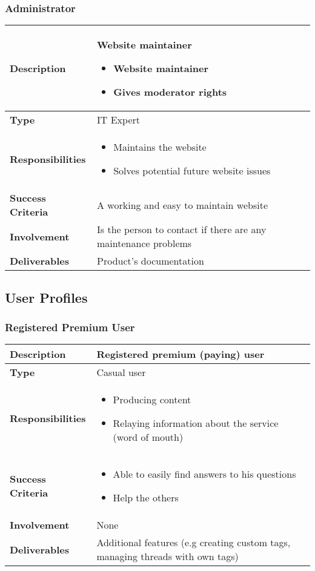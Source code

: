 \documentclass [a4paper, 12pt] {article}
\begin{document}
\subsubsection{Administrator}
\begin{tabular}{| >{\bfseries} M{4cm} | M{10cm} |}
	\hline
	Description & Website maintainer
	\begin{itemize}
		\item Website maintainer
		\item Gives moderator rights
	\end{itemize} \tabularnewline
	\hline
	Type & IT Expert \tabularnewline
	\hline
	Responsibilities &
	\begin{itemize}
		\item Maintains the website
		\item Solves potential future website issues
	\end{itemize} \tabularnewline
	\hline
	Success Criteria & A working and easy to maintain website \tabularnewline
	\hline
	Involvement & Is the person to contact if there are any maintenance problems \tabularnewline
	\hline
	Deliverables & Product's documentation \tabularnewline
	\hline
\end{tabular}

\subsection{User Profiles}
\subsubsection{Registered Premium User}
\begin{tabular}{| >{\bfseries} M{4cm} | M{10cm} |}
	\hline
	Description & Registered premium (paying) user \tabularnewline
	\hline
	Type & Casual user \tabularnewline
	\hline
	Responsibilities &
	\begin{itemize}
		\item Producing content
		\item Relaying information about the service (word of mouth)
	\end{itemize} \tabularnewline
	\hline
	Success Criteria &
	\begin{itemize}
		\item Able to easily find answers to his questions
		\item Help the others
	\end{itemize} \tabularnewline
	\hline
	Involvement & None \tabularnewline
	\hline
	Deliverables & Additional features (e.g creating custom tags, managing threads with own tags) \tabularnewline
	\hline
\end{tabular}
\end{document}
